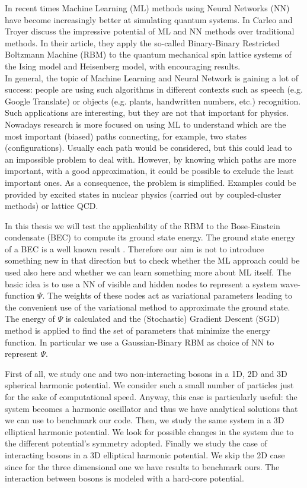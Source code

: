 In recent times Machine Learning (ML) methods using Neural Networks (NN) have become increasingly better at simulating quantum systems. In \cite{carleoSolvingQuantumManybody2017} Carleo and Troyer discuss the impressive potential of ML and NN methods over traditional methods.  In their article, they apply the so-called Binary-Binary Restricted Boltzmann Machine (RBM) to the quantum mechanical spin lattice systems of the Ising model and Heisenberg model, with
encouraging results. \\
In general, the topic of Machine Learning and Neural Network is gaining a lot of success: people are using such algorithms in different contexts such as speech (e.g. Google Translate) or objects (e.g. plants, handwritten numbers, etc.) recognition. Such applications are interesting, but they are not that important for physics. Nowadays research is more focused on using ML to understand which are the most important (biased) paths connecting, for example, two states (configurations). Usually each path would be considered, but this could lead to an impossible problem to deal with. However, by knowing which paths are more important, with a good approximation, it could be possible to exclude the least important ones. As a consequence, the problem is simplified. Examples could be provided by excited states in nuclear physics (carried out by coupled-cluster methods) or lattice QCD.

In this thesis we will test the applicability of the RBM to the Bose-Einstein condensate (BEC) to compute its ground state energy. The ground state energy of a BEC is a well known result \cite{DalfString}. Therefore our aim is not to introduce something new in that direction but to check whether the ML approach could be used also here and whether we can learn something more about ML itself. The basic idea is to use a NN of visible and hidden nodes to represent a system wave-function $\Psi$. The weights of these nodes act as variational parameters leading to the convenient use of the variational method to approximate the ground state. The energy of $\Psi$ is calculated and the (Stochastic) Gradient Descent (SGD) method is applied to find the set of parameters that minimize the energy function. In particular we use a Gaussian-Binary RBM as choice of NN to represent $\Psi$.

First of all, we study one and two non-interacting bosons in a 1D, 2D and 3D spherical harmonic potential. We consider such a small number of particles just for the sake of computational speed. Anyway, this case is particularly useful: the system becomes a harmonic oscillator and thus we have analytical solutions that we can use to benchmark our code. Then, we study the same system in a 3D elliptical harmonic potential. We look for possible changes in the system due to the different potential's symmetry adopted. Finally we study the case of interacting bosons in a 3D elliptical harmonic potential. We skip the 2D case since for the three dimensional one we have results to benchmark ours. The interaction between bosons is modeled with a hard-core potential.

